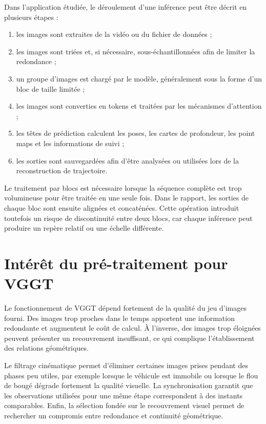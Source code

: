 \documentclass[12pt,a4paper,oneside]{report}
\begin{document}
Dans l'application étudiée, le déroulement d'une inférence peut être décrit en plusieurs étapes :
\begin{enumerate}
    \item les images sont extraites de la vidéo ou du fichier de données ;
    \item les images sont triées et, si nécessaire, sous-échantillonnées afin de limiter la redondance ;
    \item un groupe d'images est chargé par le modèle, généralement sous la forme d'un bloc de taille limitée ;
    \item les images sont converties en tokens et traitées par les mécanismes d'attention ;
    \item les têtes de prédiction calculent les poses, les cartes de profondeur, les point maps et les informations de suivi ;
    \item les sorties sont sauvegardées afin d'être analysées ou utilisées lors de la reconstruction de trajectoire.
\end{enumerate}

Le traitement par blocs est nécessaire lorsque la séquence complète est trop volumineuse pour être traitée en une seule fois. Dans le rapport, les sorties de chaque bloc sont ensuite alignées et concaténées. Cette opération introduit toutefois un risque de discontinuité entre deux blocs, car chaque inférence peut produire un repère relatif ou une échelle différente.

\section{Intérêt du pré-traitement pour VGGT}

Le fonctionnement de VGGT dépend fortement de la qualité du jeu d'images fourni. Des images trop proches dans le temps apportent une information redondante et augmentent le coût de calcul. À l'inverse, des images trop éloignées peuvent présenter un recouvrement insuffisant, ce qui complique l'établissement des relations géométriques.

Le filtrage cinématique permet d'éliminer certaines images prises pendant des phases peu utiles, par exemple lorsque le véhicule est immobile ou lorsque le flou de bougé dégrade fortement la qualité visuelle. La synchronisation garantit que les observations utilisées pour une même étape correspondent à des instants comparables. Enfin, la sélection fondée sur le recouvrement visuel permet de rechercher un compromis entre redondance et continuité géométrique.
\end{document}
